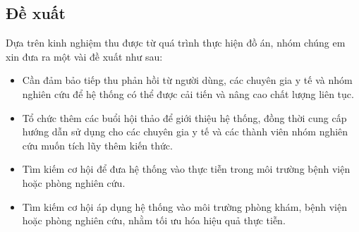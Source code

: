 \subsection*{Đề xuất}


Dựa trên kinh nghiệm thu được từ quá trình thực hiện đồ án, nhóm chúng em xin đưa ra một vài đề xuất như sau:

\begin{adjustwidth}{1.5em}{}
	\begin{itemize}
		\item Cần đảm bảo tiếp thu phản hồi từ người dùng, các chuyên gia y tế và nhóm nghiên cứu để hệ thống có thể được cải tiến và nâng cao chất lượng liên tục.

		\item Tổ chức thêm các buổi hội thảo để giới thiệu hệ thống, đồng thời cung cấp hướng dẫn sử dụng cho các chuyên gia y tế và các thành viên nhóm nghiên cứu muốn tích lũy thêm kiến thức.

		\item Tìm kiếm cơ hội để đưa hệ thống vào thực tiễn trong môi trường bệnh viện hoặc phòng nghiên cứu.

		\item Tìm kiếm cơ hội áp dụng hệ thống vào môi trường phòng khám, bệnh viện hoặc phòng nghiên cứu, nhằm tối ưu hóa hiệu quả thực tiễn.

	\end{itemize}
\end{adjustwidth}



\cleardoublepage